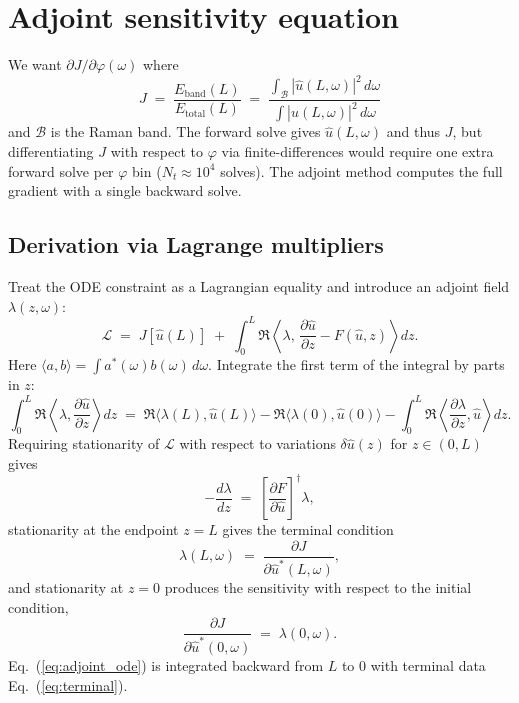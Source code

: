 \documentclass[11pt]{article}
\providecommand{\pdv}[2]{\frac{\partial #1}{\partial #2}}
\providecommand{\dv}[2]{\frac{d #1}{d #2}}
\newcommand{\uhat}{\hat{u}}
\begin{document}
\section{Adjoint sensitivity equation}

We want $\partial J / \partial \varphi(\omega)$ where
\[
  J \;=\; \frac{E_\text{band}(L)}{E_\text{total}(L)}
      \;=\; \frac{\int_\mathcal{B} |\uhat(L,\omega)|^2 \,d\omega}
                  {\int |\uhat(L,\omega)|^2 \,d\omega}
\]
and $\mathcal{B}$ is the Raman band. The forward solve gives $\uhat(L,\omega)$
and thus $J$, but differentiating $J$ with respect to $\varphi$ via
finite-differences would require one extra forward solve per $\varphi$ bin
($N_t \approx 10^4$ solves). The adjoint method computes the full gradient
with a single backward solve.

\subsection{Derivation via Lagrange multipliers}

Treat the ODE constraint as a Lagrangian equality and introduce an adjoint field
$\lambda(z,\omega)$:
\[
  \mathcal{L}
  \;=\; J[\uhat(L)]
  \;+\; \int_0^L \Re \left\langle \lambda,\,\pdv{\uhat}{z} - F(\uhat,z)\right\rangle dz.
\]
Here $\langle a,b\rangle = \int a^*(\omega) b(\omega)\,d\omega$. Integrate the
first term of the integral by parts in $z$:
\[
  \int_0^L \Re \left\langle \lambda, \pdv{\uhat}{z}\right\rangle dz
  \;=\; \Re \langle \lambda(L),\uhat(L)\rangle - \Re \langle \lambda(0),\uhat(0)\rangle
        - \int_0^L \Re \left\langle \pdv{\lambda}{z},\uhat\right\rangle dz.
\]
Requiring stationarity of $\mathcal{L}$ with respect to variations
$\delta\uhat(z)$ for $z\in(0,L)$ gives
\begin{equation}
  -\dv{\lambda}{z} \;=\; \left[\pdv{F}{\uhat}\right]^\dagger \lambda,
  \label{eq:adjoint_ode}
\end{equation}
stationarity at the endpoint $z=L$ gives the terminal condition
\begin{equation}
  \lambda(L,\omega) \;=\; \pdv{J}{\uhat^*(L,\omega)},
  \label{eq:terminal}
\end{equation}
and stationarity at $z=0$ produces the sensitivity with respect to the initial
condition,
\begin{equation}
  \pdv{J}{\uhat^*(0,\omega)} \;=\; \lambda(0,\omega).
  \label{eq:sensitivity_u0}
\end{equation}
Eq.~(\ref{eq:adjoint_ode}) is integrated backward from $L$ to $0$ with terminal
data Eq.~(\ref{eq:terminal}).
\end{document}
